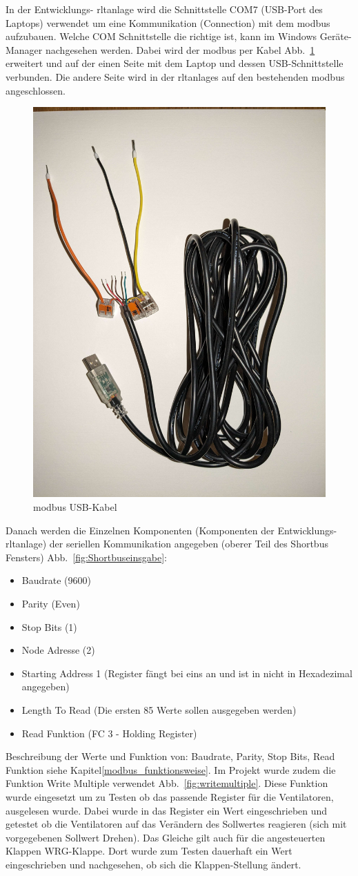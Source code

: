 In der Entwicklungs- \ac{rltanlage} wird die Schnittstelle COM7 (USB-Port des Laptops) verwendet um eine Kommunikation (Connection) mit dem \gls{modbus} aufzubauen. Welche COM Schnittstelle die richtige ist, kann im Windows Geräte-Manager nachgesehen werden. Dabei wird der \gls{modbus} per Kabel  Abb.~\ref{fig:modbus_usbkabel} erweitert und auf der einen Seite mit dem Laptop und dessen USB-Schnittstelle verbunden. Die andere Seite wird in der \acp{rltanlage} auf den bestehenden \gls{modbus} angeschlossen. 

\begin{figure}[H]
	\centering
	\includegraphics[width=0.3\linewidth]{Bilder/modbus_usbkabel}
	\caption{\gls{modbus} USB-Kabel} 
	\label{fig:modbus_usbkabel}
\end{figure}

Danach werden die Einzelnen Komponenten (Komponenten der Entwicklungs- \ac{rltanlage}) der seriellen Kommunikation angegeben (oberer Teil des Shortbus Fensters) Abb.~\ref{fig:Shortbuseinsgabe}:
\begin{itemize}
	\item Baudrate (9600)
	\item Parity (Even)
	\item Stop Bits (1)
	\item Node Adresse (2)
	\item Starting Address 1 (Register fängt bei eins an und ist in nicht in Hexadezimal angegeben)
	\item Length To Read (Die ersten 85 Werte sollen ausgegeben werden)
	\item Read Funktion (FC 3 - Holding Register)
\end{itemize}

Beschreibung der Werte und Funktion von: Baudrate, Parity, Stop Bits, Read Funktion siehe Kapitel\ref{modbus_funktionsweise}.
Im Projekt wurde zudem die Funktion Write Multiple verwendet Abb.~\ref{fig:writemultiple}. Diese Funktion wurde eingesetzt um zu Testen ob das passende Register für \zB die Ventilatoren, ausgelesen wurde. Dabei wurde in das Register ein Wert eingeschrieben und getestet ob die Ventilatoren auf das Verändern des Sollwertes reagieren (sich mit vorgegebenen Sollwert Drehen). Das Gleiche gilt auch für die angesteuerten Klappen \zB WRG-Klappe. Dort wurde zum Testen dauerhaft ein Wert eingeschrieben und nachgesehen, ob sich die Klappen-Stellung ändert.

